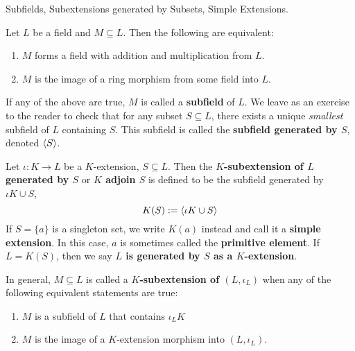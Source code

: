 \documentclass[../book.tex]{subfiles}
\begin{document}
\begin{dfn} Subfields, Subextensions generated by Subsets, Simple Extensions. 

    Let $L$ be a field and $M \subseteq L$.
    Then the following are equivalent: 
    \begin{enumerate}
        \item $M$ forms a field with addition and multiplication from $L$.
        \item $M$ is the image of a ring morphism from some field into $L$. 
    \end{enumerate}
    If any of the above are true, $M$ is called a \textbf{subfield} of $L$. 
    We leave as an exercise to the reader to check that for any subset $S \subseteq L$,
    there exists a unique \emph{smallest} subfield of $L$ containing $S$.
    This subfield is called the \textbf{subfield generated by $S$}, denoted $\langle S\rangle$. 

    Let $\iota : K \to L$ be a $K$-extension, $S \subseteq L$. 
    Then the \textbf{$K$-subextension of $L$ generated by $S$} or 
    \textbf{$K$ adjoin $S$} is defined to be the subfield generated by $\iota K \cup S$, 
    \[ K(S) := \langle \iota K \cup S\rangle \]
    If $S = \{a\}$ is a singleton set, we write $K(a)$ instead
    and call it a \textbf{simple extension}. 
    In this case, $a$ is sometimes called the \textbf{primitive element}. 
    If $L = K(S)$, then we say \textbf{$L$ is generated by $S$ as a $K$-extension}.
    
    In general, $M \subseteq L$ is called a \textbf{$K$-subextension of $(L,\iota_L)$}
    when any of the following equivalent statements are true:
    \begin{enumerate}
        \item $M$ is a subfield of $L$ that contains $\iota_L K$
        \item $M$ is the image of a $K$-extension morphism into $(L,\iota_L)$. 
    \end{enumerate}
\end{dfn}
\end{document}
